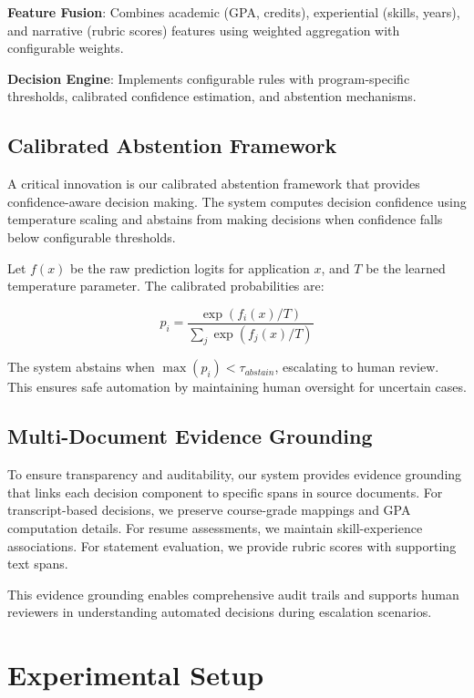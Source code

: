 \documentclass{article}
\begin{document}
\textbf{Feature Fusion}: Combines academic (GPA, credits), experiential (skills, years), and narrative (rubric scores) features using weighted aggregation with configurable weights.

\textbf{Decision Engine}: Implements configurable rules with program-specific thresholds, calibrated confidence estimation, and abstention mechanisms.

\subsection{Calibrated Abstention Framework}

A critical innovation is our calibrated abstention framework that provides confidence-aware decision making. The system computes decision confidence using temperature scaling \cite{temperature_scaling_2017} and abstains from making decisions when confidence falls below configurable thresholds.

Let $f(x)$ be the raw prediction logits for application $x$, and $T$ be the learned temperature parameter. The calibrated probabilities are:

\begin{equation}
p_i = \frac{\exp(f_i(x)/T)}{\sum_{j} \exp(f_j(x)/T)}
\end{equation}

The system abstains when $\max(p_i) < \tau_{abstain}$, escalating to human review. This ensures safe automation by maintaining human oversight for uncertain cases.

\subsection{Multi-Document Evidence Grounding}

To ensure transparency and auditability, our system provides evidence grounding that links each decision component to specific spans in source documents. For transcript-based decisions, we preserve course-grade mappings and GPA computation details. For resume assessments, we maintain skill-experience associations. For statement evaluation, we provide rubric scores with supporting text spans.

This evidence grounding enables comprehensive audit trails and supports human reviewers in understanding automated decisions during escalation scenarios.

\section{Experimental Setup}
\end{document}
